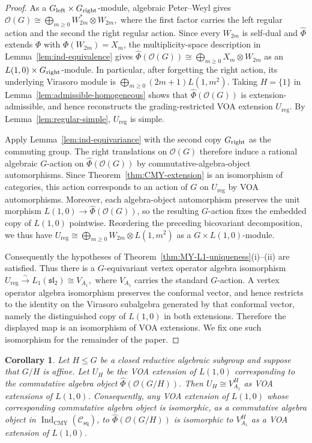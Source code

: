 \documentclass[12pt,leqno]{amsart}
\numberwithin{equation}{section} \newtheorem{thm}{Theorem}[section] \newtheorem{lem}[thm]{Lemma} \newtheorem{ex}[thm]{Example} \newtheorem{prop}[thm]{Proposition} \newtheorem{cor}[thm]{Corollary} \newtheorem{defi}[thm]{Definition} \newtheorem{rmk}[thm]{Remark} \newtheorem{notation}[thm]{Notation}
\newcommand{\OO}{\mathcal O}
\newcommand{\Csq}{\mathcal C_{\mathrm{sq}}}
\newcommand{\IndCMY}{\operatorname{Ind}_{\mathrm{CMY}}}
\begin{document}
\begin{proof}
As a $G_{\rm left}\times G_{\rm right}$-module, algebraic Peter--Weyl gives \(\OO(G)\cong\bigoplus_{m\ge0}W_{2m}^*\otimes W_{2m},\) where the first factor carries the left regular action and the second the right regular action. Since every $W_{2m}$ is self-dual and $\widehat\Phi$ extends $\Phi$ with $\Phi(W_{2m})=X_m$, the multiplicity-space description in Lemma~\ref{lem:ind-equivalence} gives \(\widehat\Phi(\OO(G))\cong\bigoplus_{m\ge0}X_m\otimes W_{2m}\) as an $L(1,0)\times G_{\rm right}$-module. In particular, after forgetting the right action, its underlying Virasoro module is \(\bigoplus_{m\ge0}(2m+1)L(1,m^2).\) Taking $H=\{1\}$ in Lemma~\ref{lem:admissible-homogeneous} shows that $\widehat\Phi(\OO(G))$ is extension-admissible, and hence reconstructs the grading-restricted VOA extension $U_{\mathrm{reg}}$. By Lemma~\ref{lem:regular-simple}, $U_{\mathrm{reg}}$ is simple.

Apply Lemma~\ref{lem:ind-equivariance} with the second copy $G_{\rm right}$ as the commuting group. The right translations on $\OO(G)$ therefore induce a rational algebraic $G$-action on $\widehat\Phi(\OO(G))$ by commutative-algebra-object automorphisms. Since Theorem~\ref{thm:CMY-extension} is an isomorphism of categories, this action corresponds to an action of $G$ on $U_{\mathrm{reg}}$ by VOA automorphisms. Moreover, each algebra-object automorphism preserves the unit morphism $L(1,0)\to\widehat\Phi(\OO(G))$, so the resulting $G$-action fixes the embedded copy of $L(1,0)$ pointwise. Reordering the preceding bicovariant decomposition, we thus have \(U_{\mathrm{reg}}\cong\bigoplus_{m\ge0}W_{2m}\otimes L(1,m^2)\) as a $G\times L(1,0)$-module.

Consequently the hypotheses of Theorem~\ref{thm:MY-L1-uniqueness}\textnormal{(i)--(ii)} are satisfied. Thus there is a $G$-equivariant vertex operator algebra isomorphism \(U_{\mathrm{reg}}\overset\sim\longrightarrow L_1(\mathfrak{sl}_2)\cong V_{A_1},\) where $V_{A_1}$ carries the standard $G$-action. A vertex operator algebra isomorphism preserves the conformal vector, and hence restricts to the identity on the Virasoro subalgebra generated by that conformal vector, namely the distinguished copy of $L(1,0)$ in both extensions. Therefore the displayed map is an isomorphism of VOA extensions. We fix one such isomorphism for the remainder of the paper.
\end{proof}

\begin{cor}\label{cor:fixed-point-dictionary}
Let $H\le G$ be a closed reductive algebraic subgroup and suppose that $G/H$ is affine. Let $U_H$ be the VOA extension of $L(1,0)$ corresponding to the commutative algebra object \(\widehat\Phi(\OO(G/H))\). Then \(U_H\cong V_{A_1}^{H}\) as VOA extensions of $L(1,0)$. Consequently, any VOA extension of $L(1,0)$ whose corresponding commutative algebra object is isomorphic, as a commutative algebra object in $\IndCMY(\Csq)$, to \(\widehat\Phi(\OO(G/H))\) is isomorphic to $V_{A_1}^{H}$ as a VOA extension of $L(1,0)$.
\end{cor}
\end{document}

